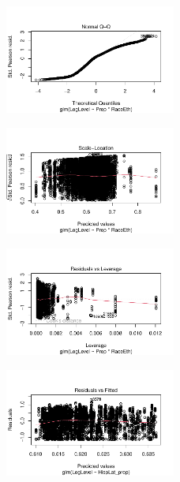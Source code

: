 \documentclass[
  letterpaper,
  DIV=11,
  numbers=noendperiod]{scrartcl}
\begin{document}
\begin{figure}[H]

{\centering \includegraphics[width=0.5\textwidth,height=\textheight]{appendix_files/figure-pdf/unnamed-chunk-5-2.pdf}

}

\end{figure}

\begin{figure}[H]

{\centering \includegraphics[width=0.5\textwidth,height=\textheight]{appendix_files/figure-pdf/unnamed-chunk-5-3.pdf}

}

\end{figure}

\begin{figure}[H]

{\centering \includegraphics[width=0.5\textwidth,height=\textheight]{appendix_files/figure-pdf/unnamed-chunk-5-4.pdf}

}

\end{figure}

\begin{figure}[H]

{\centering \includegraphics[width=0.5\textwidth,height=\textheight]{appendix_files/figure-pdf/unnamed-chunk-5-5.pdf}

}

\end{figure}
\end{document}
